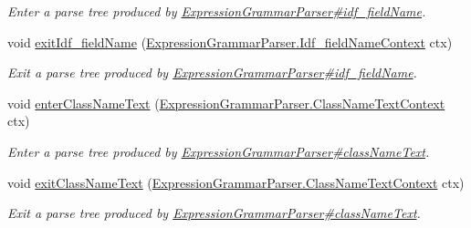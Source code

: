 \begin{DoxyCompactItemize}
\begin{DoxyCompactList}\small\item\em Enter a parse tree produced by \hyperlink{classgov_1_1nasa_1_1jpf_1_1inspector_1_1server_1_1expression_1_1parser_1_1_expression_grammar_parser_a6123d29ed4ca503a4952f04ea9e7a81f}{Expression\+Grammar\+Parser\#idf\+\_\+field\+Name}. \end{DoxyCompactList}\item 
void \hyperlink{interfacegov_1_1nasa_1_1jpf_1_1inspector_1_1server_1_1expression_1_1parser_1_1_expression_grammar_listener_ad0c61f3017b98df0700059f5dba09c0d}{exit\+Idf\+\_\+field\+Name} (\hyperlink{classgov_1_1nasa_1_1jpf_1_1inspector_1_1server_1_1expression_1_1parser_1_1_expression_grammar_pad53202cd69742416986508e382be2265}{Expression\+Grammar\+Parser.\+Idf\+\_\+field\+Name\+Context} ctx)
\begin{DoxyCompactList}\small\item\em Exit a parse tree produced by \hyperlink{classgov_1_1nasa_1_1jpf_1_1inspector_1_1server_1_1expression_1_1parser_1_1_expression_grammar_parser_a6123d29ed4ca503a4952f04ea9e7a81f}{Expression\+Grammar\+Parser\#idf\+\_\+field\+Name}. \end{DoxyCompactList}\item 
void \hyperlink{interfacegov_1_1nasa_1_1jpf_1_1inspector_1_1server_1_1expression_1_1parser_1_1_expression_grammar_listener_a74a816bd92d5e6a6b2113c52e00d9056}{enter\+Class\+Name\+Text} (\hyperlink{classgov_1_1nasa_1_1jpf_1_1inspector_1_1server_1_1expression_1_1parser_1_1_expression_grammar_pa73f78f15ab35f00cdc76079d9a864524}{Expression\+Grammar\+Parser.\+Class\+Name\+Text\+Context} ctx)
\begin{DoxyCompactList}\small\item\em Enter a parse tree produced by \hyperlink{classgov_1_1nasa_1_1jpf_1_1inspector_1_1server_1_1expression_1_1parser_1_1_expression_grammar_parser_a146c2558746623f23b5705d8e32eaded}{Expression\+Grammar\+Parser\#class\+Name\+Text}. \end{DoxyCompactList}\item 
void \hyperlink{interfacegov_1_1nasa_1_1jpf_1_1inspector_1_1server_1_1expression_1_1parser_1_1_expression_grammar_listener_ab1826a12672a36ef45b901791f72ceb0}{exit\+Class\+Name\+Text} (\hyperlink{classgov_1_1nasa_1_1jpf_1_1inspector_1_1server_1_1expression_1_1parser_1_1_expression_grammar_pa73f78f15ab35f00cdc76079d9a864524}{Expression\+Grammar\+Parser.\+Class\+Name\+Text\+Context} ctx)
\begin{DoxyCompactList}\small\item\em Exit a parse tree produced by \hyperlink{classgov_1_1nasa_1_1jpf_1_1inspector_1_1server_1_1expression_1_1parser_1_1_expression_grammar_parser_a146c2558746623f23b5705d8e32eaded}{Expression\+Grammar\+Parser\#class\+Name\+Text}. \end{DoxyCompactList}\item 

\end{DoxyCompactItemize}
